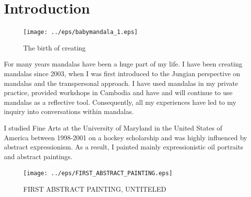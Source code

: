 \chapter{Introduction}

\begin{figure}[htbp]
\begin{center}
\texttt{[image: ../eps/babymandala\_1.eps]} 
\caption{The birth of creating}
\label{label}
\end{center}
\end{figure}


\newpage 


For many years mandalas have been a huge part of my life. I have been creating mandalas since 2003, when I was first introduced to the Jungian perspective on mandalas and the transpersonal approach. I have used mandalas in my private practice, provided workshops in Cambodia and have and will continue to use mandalas as a reflective tool. Consequently, all my experiences have led to my inquiry into conversations within mandalas.

I studied Fine Arts at the University of Maryland in the United States of America between 1998-2001 on a hockey scholarship and was highly influenced by abstract expressionism. As a result, I painted mainly expressionistic oil portraits and abstract paintings.


\begin{figure}[htbp]
\begin{center}
\texttt{[image: ../eps/FIRST\_ABSTRACT\_PAINTING.eps]}
\caption{FIRST ABSTRACT PAINTING, UNTITELED}
\label{label}
\end{center}
\end{figure}
\newpage 

